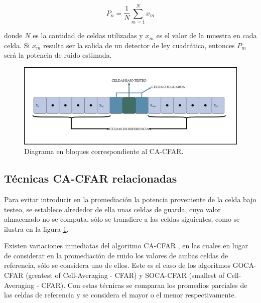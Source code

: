 \begin{equation}
P_{n} = \dfrac{1}{N} \sum_{m=1}^{N} x_m
\end{equation}

donde \(N\) es la cantidad de celdas utilizadas y \(x_{m}\) es el valor de la muestra en cada celda. Si \(x_{m}\) resulta ser la salida de un detector de ley cuadrática, entonces \(P_{m}\) será la potencia de ruido estimada.




\begin{figure}
\centering
\includegraphics[scale=0.25]{./Figures/Estructura-del-Esquema-CA-CFAR.png}
\caption{Diagrama en bloques correspondiente al CA-CFAR.}
\label{fig:estructura_cfar}
\end{figure}

\subsection{Técnicas CA-CFAR relacionadas}

Para evitar introducir en la promediación la potencia proveniente de la celda bajo testeo, se establece alrededor de ella unas celdas de guarda, cuyo valor almacenado no se computa, sólo se transfiere a las celdas siguientes, como se ilustra en la figura \ref{fig:estructura_cfar}.

Existen variaciones inmediatas del algoritmo CA-CFAR \citep{CFAR_techniques}, en las cuales en lugar de considerar en la promediación de ruido los valores de ambas celdas de referencia, sólo se considera uno de ellos. Este es el caso de los algoritmos GOCA-CFAR (greatest of Cell-Averaging - CFAR) y SOCA-CFAR (smallest of Cell-Averaging - CFAR). Con estas técnicas se comparan los promedios parciales de las celdas de referencia y se considera el mayor o el menor respectivamente.

